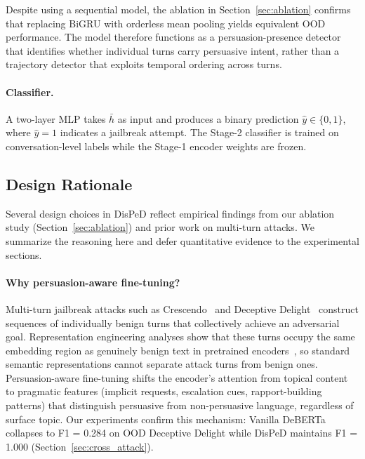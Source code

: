 Despite using a sequential model, the ablation in Section~\ref{sec:ablation} confirms that replacing BiGRU with orderless mean pooling yields equivalent OOD performance. The model therefore functions as a persuasion-presence detector that identifies whether individual turns carry persuasive intent, rather than a trajectory detector that exploits temporal ordering across turns.

\paragraph{Classifier.}
A two-layer MLP takes $\bar{h}$ as input and produces a binary prediction $\hat{y} \in \{0, 1\}$, where $\hat{y} = 1$ indicates a jailbreak attempt. The Stage-2 classifier is trained on conversation-level labels while the Stage-1 encoder weights are frozen.

\subsection{Design Rationale}
\label{sec:rationale}

Several design choices in DisPeD reflect empirical findings from our ablation study (Section~\ref{sec:ablation}) and prior work on multi-turn attacks. We summarize the reasoning here and defer quantitative evidence to the experimental sections.

\paragraph{Why persuasion-aware fine-tuning?}
Multi-turn jailbreak attacks such as Crescendo~\citep{russinovich2024crescendo} and Deceptive Delight~\citep{deceptivedelight2024} construct sequences of individually benign turns that collectively achieve an adversarial goal. Representation engineering analyses show that these turns occupy the same embedding region as genuinely benign text in pretrained encoders~\citep{bullwinkel2025repeng}, so standard semantic representations cannot separate attack turns from benign ones. Persuasion-aware fine-tuning shifts the encoder's attention from topical content to pragmatic features (implicit requests, escalation cues, rapport-building patterns) that distinguish persuasive from non-persuasive language, regardless of surface topic. Our experiments confirm this mechanism: Vanilla DeBERTa collapses to F1 = 0.284 on OOD Deceptive Delight while DisPeD maintains F1 = 1.000 (Section~\ref{sec:cross_attack}).

